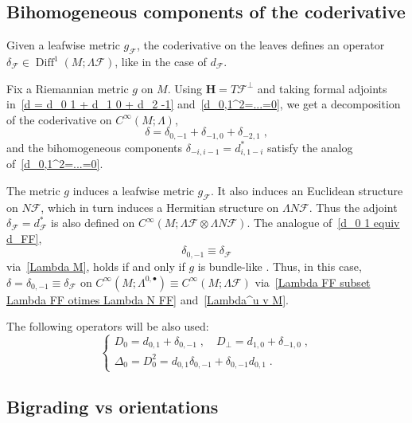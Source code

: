 \documentclass{memo-l}
\theoremstyle{plain}
\theoremstyle{definition}
\theoremstyle{remark}
\newcommand{\FF}{\mathcal{F}}
\newcommand{\bfH}{\boldsymbol{H}}
\newcommand{\Diff}{\operatorname{Diff}}
\numberwithin{section}{chapter}
\numberwithin{equation}{section}%
\begin{document}
\subsection{Bihomogeneous components of the coderivative}\label{ss: delta_i j}

Given a leafwise metric $g_\FF$, the coderivative on the leaves defines an operator $\delta_\FF\in\Diff^1(M;\Lambda\FF)$, like in the case of $d_\FF$.

Fix a Riemannian metric $g$ on $M$. Using $\bfH=T\FF^\perp$ and taking formal adjoints in~\eqref{d = d_0 1 + d_1 0 + d_2 -1} and~\eqref{d_0,1^2=...=0}, we get a decomposition of the coderivative on $C^\infty(M;\Lambda)$,
\begin{equation}\label{delta = delta_0 -1 + delta_-1 0 + delta_-2 1}
\delta=\delta_{0,-1}+\delta_{-1,0}+\delta_{-2,1}\;,
\end{equation}
and the bihomogeneous components $\delta_{-i,i-1}=d_{i,1-i}^*$  satisfy the analog of~\eqref{d_0,1^2=...=0}. 

The metric $g$ induces a leafwise metric $g_\FF$. It also induces an Euclidean structure on $N\FF$, which in turn induces a Hermitian structure on $\Lambda N\FF$. Thus the adjoint $\delta_\FF=d_\FF^*$ \index{$\delta_\FF$} is also defined on $C^\infty(M;\Lambda\FF\otimes\Lambda N\FF)$. The analogue of~\eqref{d_0 1 equiv d_FF},
\begin{equation}\label{delta_0 -1 equiv delta_FF}
\delta_{0,-1}\equiv\delta_\FF
\end{equation}
via~\eqref{Lambda M}, holds if and only if $g$ is bundle-like \cite[Lemma~4.12]{AlvKordyLeichtnam2020}. Thus, in this case, $\delta=\delta_{0,-1}\equiv\delta_\FF$ on $C^\infty(M;\Lambda^{0,\bullet})\equiv C^\infty(M;\Lambda\FF)$ via~\eqref{Lambda FF subset Lambda FF otimes Lambda N FF} and~\eqref{Lambda^u v M}. 
 
The following operators will be also used:
\begin{equation}\label{D_0 D_perp Delta_0}
\left\{
\begin{gathered}
D_0=d_{0,1}+\delta_{0,-1}\;,\quad
D_\perp=d_{1,0}+\delta_{-1,0}\;,\\
\Delta_0=D_0^2=d_{0,1}\delta_{0,-1}+\delta_{0,-1}d_{0,1}\;.
\end{gathered}
\right.
\end{equation}



\subsection{Bigrading vs orientations}\label{ss: bigrading vs orientations}
\end{document}
